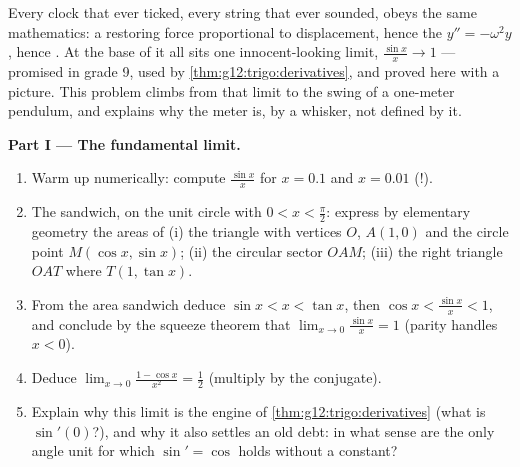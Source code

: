 \begin{problem}
\label{pb:g12:trigo:1}
Every clock that ever ticked, every string that ever sounded,
obeys the same mathematics: a restoring force proportional to
displacement, hence the  $y'' = -\omega^2 y$, hence
. At the base of it all sits one innocent-looking limit,
$\frac{\sin x}{x} \to 1$ --- promised in grade 9, used by
\cref{thm:g12:trigo:derivatives}, and proved here with a picture.
This problem climbs from that limit to the swing of a one-meter
pendulum, and explains why the meter is, by a whisker, not
defined by it.

\medskip
\noindent\textbf{Part I --- The fundamental limit.}
\begin{enumerate}
  \item Warm up numerically: compute $\frac{\sin x}{x}$ for
        $x = 0.1$ and $x = 0.01$ (!).
  \item The sandwich, on the unit circle with
        $0 < x < \frac\pi2$: express by elementary geometry the
        areas of (i) the triangle with vertices $O$, $A(1,0)$
        and the circle point $M(\cos x, \sin x)$; (ii) the
        circular sector $OAM$; (iii) the right triangle $OAT$
        where $T(1, \tan x)$.
  \item From the area sandwich deduce
        $\sin x < x < \tan x$, then
        $\cos x < \frac{\sin x}{x} < 1$, and conclude by the
        squeeze theorem that
        $\lim_{x \to 0} \frac{\sin x}{x} = 1$ (parity handles
        $x < 0$).
  \item Deduce
        $\lim_{x \to 0} \frac{1 - \cos x}{x^2} = \frac12$
        (multiply by the conjugate).
  \item Explain why this limit is the engine of
        \cref{thm:g12:trigo:derivatives} (what is
        $\sin'(0)$?), and why it also settles an old debt: in
        what sense are \emph{} the only angle unit for
        which $\sin' = \cos$ holds without a constant?
\end{enumerate}


\end{problem}
